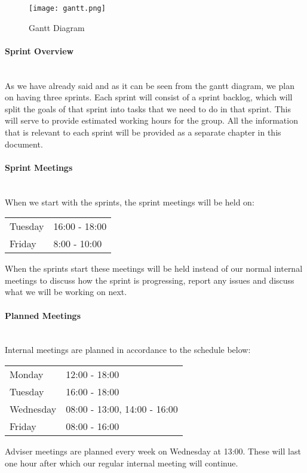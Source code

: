 \documentclass[../document.tex]{subfiles}
\begin{document}
\begin{figure}[H]
\centering
\texttt{[image: gantt.png]}
\caption{Gantt Diagram}
\end{figure}

\paragraph{Sprint Overview} \ \\
As we have already said and as it can be seen from the gantt diagram, we plan on having three sprints. Each sprint will consist of a sprint backlog, which will split the goals of that sprint into tasks that we need to do in that sprint. This will serve to provide estimated working hours for the group. All the information that is relevant to each sprint will be provided as a separate chapter in this document. 

\paragraph{Sprint Meetings} \ \\
When we start with the sprints, the sprint meetings will be held on:
\begin{table}[H]
\begin{tabular}{ll}
\hline
Tuesday	&	16:00 - 18:00 \\
Friday		&	8:00 - 10:00 \\
\hline
\end{tabular}
\end{table}
When the sprints start these meetings will be held instead of our normal internal meetings to discuss how the sprint is progressing, report any issues and discuss what we will be working on next.

\paragraph{Planned Meetings} \ \\
Internal meetings are planned in accordance to the schedule below:
\begin{table}[H]
\begin{tabular}{ll}
\hline
Monday 	&	12:00 - 18:00 \\
Tuesday 	&	16:00 - 18:00 \\
Wednesday 	&	08:00 - 13:00, 14:00 - 16:00 \\
Friday 	&	08:00 - 16:00 \\
\hline
\end{tabular}
\end{table}
Adviser meetings are planned every week on Wednesday at 13:00. These will last one hour after which our regular internal meeting will continue.
\end{document}
